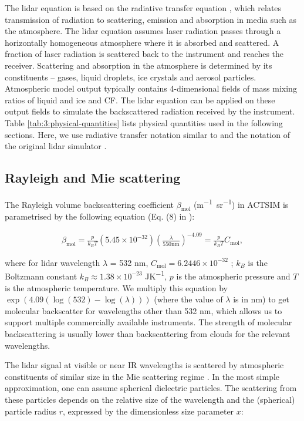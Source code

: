 The lidar equation \citep{emeis2010} is based on the radiative transfer equation \citep{goody1995,liou2002,petty2006,zdunkowski2007},
which relates transmission of radiation to scattering, emission and absorption
in media such as the atmosphere. The lidar equation assumes laser radiation
passes through a
horizontally homogeneous atmosphere where it is absorbed and scattered. A fraction
of laser radiation is scattered back to the instrument and reaches the receiver.
Scattering and absorption in the
atmosphere is determined by its constituents -- gases, liquid droplets,
ice crystals and aerosol particles.
Atmospheric model output typically contains 4-dimensional fields of mass mixing ratios
of liquid and ice and CF. The lidar equation can be applied on these
output fields to simulate the backscattered radiation received by the instrument.
Table \ref{tab:3:physical-quantities} lists physical quantities used in the
following sections. Here, we use radiative transfer notation similar to
\cite{petty2006} and the notation of the original lidar simulator
\citep{chiriaco2006}.

\subsection{Rayleigh and Mie scattering}
\label{sec:3:rayleigh-and-mie-scattering}

The Rayleigh volume backscattering coefficient $\beta_\text{mol}$ (\unit{m^{-1}sr^{-1}}) in ACTSIM is parametrised by the following equation
(Eq. (8) in \cite{chiriaco2006}):

\begin{align}
\beta_\text{mol} = \frac{p}{k_BT}(5.45\times 10^{-32})\left(\frac{\lambda}{550 \mathrm{nm}}\right)^{-4.09}
= \frac{p}{k_BT}C_\text{mol} ,
\end{align}

\noindent where for lidar wavelength $\lambda$ = 532 nm, $C_\text{mol} = 6.2446\times 10^{-32}$
; $k_B$ is the Boltzmann constant $k_B \approx 1.38\times 10^{-23}$ \unit{JK^{-1}},
$p$ is the atmospheric pressure and $T$ is the atmospheric temperature.
We multiply this equation by $\exp(4.09(\log(532) - \log(\lambda)))$ (where the value of $\lambda$ is in nm)
to get molecular backscatter for wavelengths other than 532 nm, which allows us to support multiple commercially available instruments.
The strength of molecular backscattering is usually lower than
backscattering from clouds for the relevant wavelengths.

The lidar signal at visible or near IR wavelengths is scattered by
atmospheric constituents of similar size in the Mie scattering regime \citep{mie1908}.
In the most simple approximation,
one can assume spherical dielectric particles. The scattering from these particles depends on the
relative size of the wavelength and the (spherical) particle radius $r$, expressed by the
dimensionless size parameter $x$:

